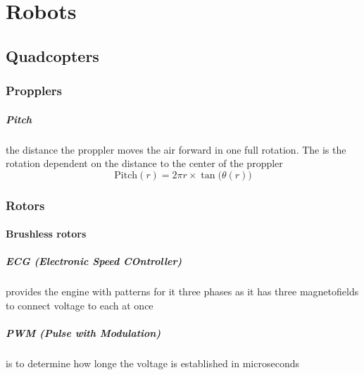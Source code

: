 \chapter{Robots}
\section{Quadcopters}
    \subsection{Propplers}
        \paragraph{Pitch}
            the distance the proppler moves the air forward in one full rotation.
            The \theta is the rotation dependent on the distance to the center of the proppler
            \[
            \text{Pitch}(r) = 2\pi r \times \tan\big(\theta(r)\big)
            \]
    \subsection{Rotors}
        
    \subsubsection{Brushless rotors}
        \paragraph{ECG (Electronic Speed COntroller)}
            provides the engine with patterns for it three phases as it has three magnetofields to connect voltage to each at once
        \paragraph{PWM (Pulse with Modulation)}
            is to determine how longe the voltage is established in microseconds
